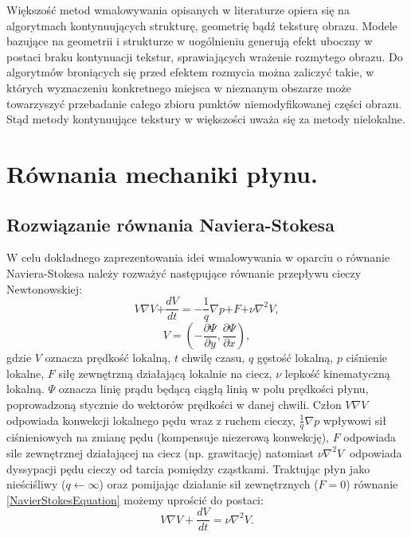 \documentclass[12pt, twoside, openany]{report}
\theoremstyle{definition}
\begin{document}
Większość metod wmalowywania opisanych w literaturze opiera się na algorytmach kontynuujących strukturę, geometrię bądź teksturę obrazu. Modele bazujące na geometrii i strukturze w uogólnieniu generują efekt uboczny w postaci braku kontynuacji tekstur, sprawiających wrażenie rozmytego obrazu. Do algorytmów broniących się przed efektem rozmycia można zaliczyć takie, w których wyznaczeniu konkretnego miejsca w nieznanym obszarze może towarzyszyć przebadanie całego zbioru punktów niemodyfikowanej części obrazu. Stąd metody kontynuujące tekstury w większości uważa się za metody nielokalne.
\chapter{Równania mechaniki płynu.}
\label{chap:navierstokes}
\section{Rozwiązanie równania Naviera-Stokesa }
\label{sec:snavierstokes}
W celu dokładnego zaprezentowania idei wmalowywania w oparciu o równanie Naviera-Stokesa należy rozważyć następujące równanie przepływu cieczy Newtonowskiej:
\begin{equation}
V \nabla V \mathrm{+} \frac{dV}{dt} = - \frac{\mathrm{1}}{q}\nabla p\mathrm{+}F \mathrm{+}\nu {\nabla }^{\mathrm{2}} V
\label{NavierStokesEquation}
,
\end{equation}
\begin{equation}
V = \left( -\frac{\partial\Psi}{\partial y},\frac{\partial \Psi}{\partial x} \right)
\label{LiquidVelociy}
,
\end{equation}
gdzie $V$ oznacza prędkość lokalną, $t$ chwilę czasu, $q$ gęstość lokalną, $p$ ciśnienie lokalne, $F$ siłę zewnętrzną działającą lokalnie na ciecz, $\nu$ lepkość kinematyczną lokalną. $\mathit{\Psi}$ oznacza linię prądu będącą ciągłą linią w polu prędkości płynu, poprowadzoną
stycznie do wektorów prędkości w danej chwili. Człon $V\nabla V$ odpowiada konwekcji lokalnego pędu wraz z ruchem cieczy, $\frac{1}{q}\nabla p$ wpływowi sił ciśnieniowych na zmianę pędu (kompensuje niezerową konwekcję),  $F$ odpowiada sile zewnętrznej działającej na ciecz (np. grawitację) natomiast $\nu {\nabla }^2V\ $ odpowiada dyssypacji pędu cieczy od tarcia pomiędzy cząstkami. Traktując płyn jako nieściśliwy ($q \leftarrow \infty $)  oraz pomijając działanie sił zewnętrznych ($F=0$)  równanie \eqref{NavierStokesEquation} możemy uprościć do postaci:
\begin{equation}
 V\nabla V+\frac{dV}{dt}=\nu {\nabla }^2V
\label{NavierStokesEquationShort}
.
\end{equation}
\end{document}
